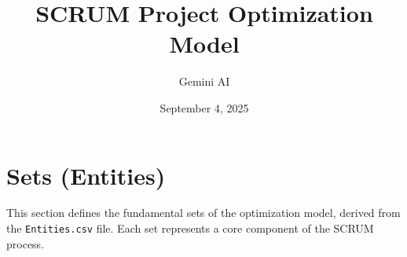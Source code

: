 \documentclass[11pt, a4paper]{article}
\title{SCRUM Project Optimization Model}
\author{Gemini AI}
\date{September 4, 2025}
\begin{document}
\maketitle
\thispagestyle{empty}

\newpage
\tableofcontents
\thispagestyle{empty}

\newpage
\setcounter{page}{1}

\section{Sets (Entities)}
This section defines the fundamental sets of the optimization model, derived from the \texttt{Entities.csv} file. Each set represents a core component of the SCRUM process.
\end{document}
